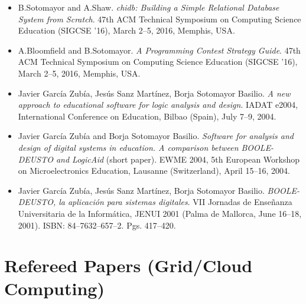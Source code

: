 \documentclass[11pt,letterpaper,sans]{moderncv}
\begin{document}
\begin{itemize}
\item B.Sotomayor and A.Shaw. \emph{chidb: Building a Simple Relational Database System from Scratch}. 47th ACM Technical Symposium on Computing Science Education (SIGCSE '16), March 2--5, 2016, Memphis, USA.
\item A.Bloomfield and B.Sotomayor. \emph{A Programming Contest Strategy Guide}. 47th ACM Technical Symposium on Computing Science Education (SIGCSE '16), March 2--5, 2016, Memphis, USA.
\item Javier Garc\'ia Zub\'ia, Jes\'us Sanz Mart\'inez, Borja Sotomayor Basilio. \emph{A new approach to educational software for logic analysis and design}. IADAT e2004, International Conference on Education, Bilbao (Spain), July 7--9, 2004.
\item Javier Garc\'ia Zub\'ia and Borja Sotomayor Basilio. \emph{Software for analysis and design of digital systems in education. A comparison between BOOLE-DEUSTO and LogicAid} (short paper). EWME 2004, 5th European Workshop on Microelectronics Education, Lausanne (Switzerland), April 15--16, 2004.
\item Javier Garc\'ia Zub\'ia, Jes\'us Sanz Mart\'inez, Borja Sotomayor Basilio. \emph{BOOLE-DEUSTO, la aplicaci\'on para sistemas digitales}. VII Jornadas de Ense\~nanza Universitaria de la Inform\'atica, JENUI 2001 (Palma de Mallorca, June 16--18, 2001). ISBN: 84--7632--657--2. Pgs. 417--420.
\end{itemize}

\section{Refereed Papers (Grid/Cloud Computing)}
\end{document}
